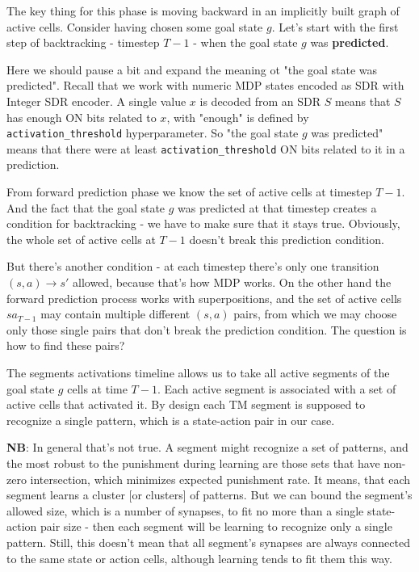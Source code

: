 \documentclass[a4paper]{article}
\begin{document}


The key thing for this phase is moving backward in an implicitly built graph of active cells. Consider having chosen some goal state $g$. Let's start with the first step of backtracking - timestep $T-1$ - when the goal state $g$ was \textbf{predicted}.

Here we should pause a bit and expand the meaning ot "the goal state was predicted". Recall that we work with numeric MDP states encoded as SDR with Integer SDR encoder. A single value $x$ is decoded from an SDR $S$ means that $S$ has enough ON bits related to $x$, with "enough" is defined by \verb|activation_threshold| hyperparameter. So "the goal state $g$ was predicted" means that there were at least \verb|activation_threshold| ON bits related to it in a prediction.

From forward prediction phase we know the set of active cells at timestep $T-1$. And the fact that the goal state $g$ was predicted at that timestep creates a condition for backtracking - we have to make sure that it stays true. Obviously, the whole set of active cells at $T-1$ doesn't break this prediction condition.

But there's another condition - at each timestep there's only one transition $(s, a) \rightarrow s'$ allowed, because that's how MDP works. On the other hand the forward prediction process works with superpositions, and the set of active cells $sa_{T-1}$ may contain multiple different $(s, a)$ pairs, from which we may choose only those single pairs that don't break the prediction condition. The question is how to find these pairs?

The segments activations timeline allows us to take all active segments of the goal state $g$ cells at time $T-1$. Each active segment is associated with a set of active cells that activated it. By design each TM segment is supposed to recognize a single pattern, which is a state-action pair in our case.

\textbf{NB}: In general that's not true. A segment might recognize a set of patterns, and the most robust to the punishment during learning are those sets that have non-zero intersection, which minimizes expected punishment rate. It means, that each segment learns a cluster [or clusters] of patterns. But we can bound the segment's allowed size, which is a number of synapses, to fit no more than a single state-action pair size - then each segment will be learning to recognize only a single pattern. Still, this doesn't mean that all segment's synapses are always connected to the same state or action cells, although learning tends to fit them this way.
\end{document}
